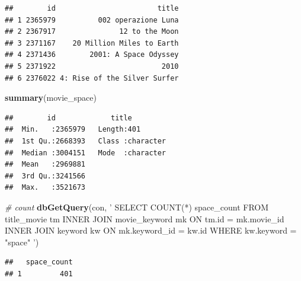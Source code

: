 \documentclass[]{article}
\newenvironment{Shaded}{\begin{snugshade}}{\end{snugshade}}
\newcommand{\KeywordTok}[1]{\textcolor[rgb]{0.13,0.29,0.53}{\textbf{{#1}}}}
\newcommand{\StringTok}[1]{\textcolor[rgb]{0.31,0.60,0.02}{{#1}}}
\newcommand{\CommentTok}[1]{\textcolor[rgb]{0.56,0.35,0.01}{\textit{{#1}}}}
\newcommand{\NormalTok}[1]{{#1}}
\begin{document}
\begin{verbatim}
##        id                        title
## 1 2365979          002 operazione Luna
## 2 2367917               12 to the Moon
## 3 2371167    20 Million Miles to Earth
## 4 2371436        2001: A Space Odyssey
## 5 2371922                         2010
## 6 2376022 4: Rise of the Silver Surfer
\end{verbatim}

\begin{Shaded}
\begin{Highlighting}[]
\KeywordTok{summary}\NormalTok{(movie_space)}
\end{Highlighting}
\end{Shaded}

\begin{verbatim}
##        id             title
##  Min.   :2365979   Length:401
##  1st Qu.:2668393   Class :character
##  Median :3004151   Mode  :character
##  Mean   :2969881
##  3rd Qu.:3241566
##  Max.   :3521673
\end{verbatim}

\begin{Shaded}
\begin{Highlighting}[]
\CommentTok{# count}
\KeywordTok{dbGetQuery}\NormalTok{(con, }\StringTok{'}
\StringTok{           SELECT COUNT(*) space_count}
\StringTok{           FROM title_movie tm INNER JOIN movie_keyword mk ON tm.id = mk.movie_id}
\StringTok{              INNER JOIN keyword kw ON mk.keyword_id = kw.id}
\StringTok{           WHERE kw.keyword = "space"}
\StringTok{           '}\NormalTok{)}
\end{Highlighting}
\end{Shaded}

\begin{verbatim}
##   space_count
## 1         401
\end{verbatim}

\begin{Shaded}
\end{Shaded}
\end{document}
